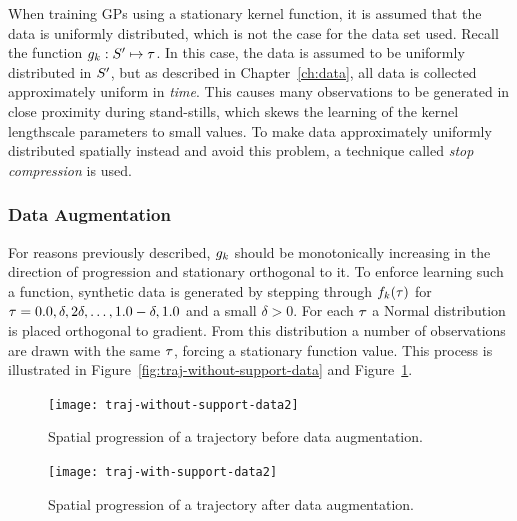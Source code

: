 When training GPs using a stationary kernel function, it is assumed
that the data is uniformly distributed, which is not the case for the
data set used. Recall the function $g_{k} : S' \mapsto
\tau$. In this case, the data is assumed to be uniformly
distributed in $S'$, but as described in Chapter~\ref{ch:data},
all data is collected approximately uniform in \textit{time}. This causes many
observations to be generated in close proximity during stand-stills, which skews the
learning of the kernel lengthscale parameters to small values. To
make data approximately uniformly distributed spatially instead and 
avoid this problem, a technique called \textit{stop compression} is used.

\subsubsection{Data Augmentation}\label{sec:data-augmentation}
For reasons previously described, $g_{k}$ should be monotonically increasing in
the direction of progression and stationary orthogonal to it.
To enforce learning such a function, synthetic data is generated by
stepping through $f_{k}(\tau)$ for $\tau = 0.0,
\delta, 2\delta, \dots, 1.0-\delta, 1.0$ and a small $\delta > 0$. For each
$\tau$ a Normal distribution is placed orthogonal to
gradient. From this distribution a number of observations are drawn with the same 
$\tau$, forcing a stationary function value. This process is illustrated in
Figure~\ref{fig:traj-without-support-data} and
Figure~\ref{fig:traj-with-support-data}. 
\begin{figure}
  \begin{minipage}{.46\textwidth}
    \texttt{[image: traj-without-support-data2]}
    \caption{Spatial progression of a trajectory
      before data augmentation.}\label{fig:traj-without-support-data}
  \end{minipage}
  \hspace{5pt}
  \begin{minipage}{.46\textwidth}
    \texttt{[image: traj-with-support-data2]}
    \caption{Spatial progression of a trajectory
      after data augmentation. }\label{fig:traj-with-support-data}
  \end{minipage}
\end{figure}

